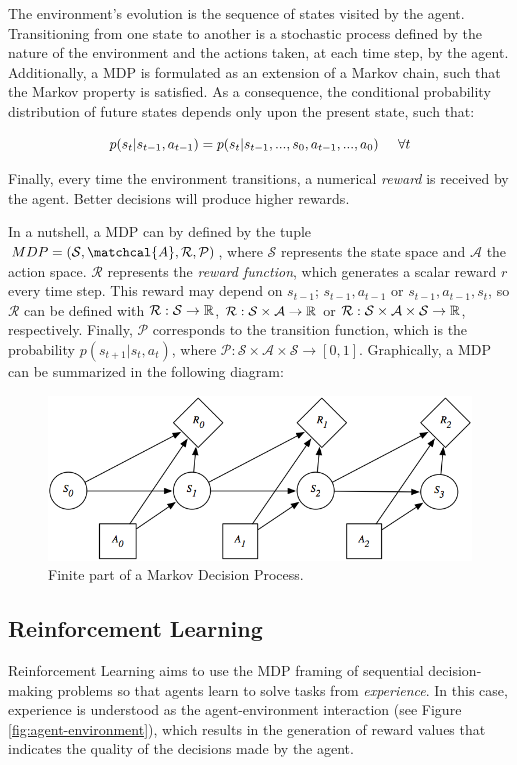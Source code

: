 The environment's evolution is the sequence of states visited by the agent. Transitioning from one state to another is a stochastic process defined by the nature of the environment and the actions taken, at each time step, by the agent. Additionally, a MDP is formulated as an extension of a Markov chain, such that the Markov property is satisfied. As a consequence, the conditional probability distribution of future states depends only upon the present state, such that:

\begin{equation}
    p(s_{t}|s_{t-1}, a_{t-1}) = p(s_{t}|s_{t-1},...,s_{0},a_{t-1},...,a_{0})  \hspace{0.5cm} \forall t
\end{equation}

Finally, every time the environment transitions, a numerical \emph{reward} is received by the agent. Better decisions will produce higher rewards.

In a nutshell, a MDP can by defined by the tuple $MDP=(\mathcal{S},\matchcal{A},\mathcal{R},\mathcal{P})$, where $\mathcal{S}$ represents the state space and $\mathcal{A}$ the action space. $\mathcal{R}$ represents the \emph{reward function}, which generates a scalar reward $r$ every time step. This reward may depend on $s_{t-1}$; $s_{t-1},a_{t-1}$ or $s_{t-1},a_{t-1},s_{t}$, so $\mathcal{R}$ can be defined with $\mathcal{R}: \mathcal{S} \to \mathbb{R}$, $\mathcal{R}: \mathcal{S} \times \mathcal{A} \to \mathbb{R}$ or $\mathcal{R}: \mathcal{S} \times \mathcal{A} \times \mathcal{S} \to \mathbb{R}$, respectively. Finally, $\mathcal{P}$ corresponds to the transition function, which is the probability $p(s_{t+1}|s_{t}, a_{t})$, where $\mathcal{P}: \mathcal{S} \times \mathcal{A} \times \mathcal{S} \to [0, 1]$. Graphically, a MDP can be summarized in the following diagram:

\begin{figure}[H]
    \centering
    \includegraphics[width=0.7\linewidth]{imagenes/cap1/mdp.png}
    \caption{Finite part of a Markov Decision Process.}
    \label{fig:msim}
\end{figure}

\subsection{Reinforcement Learning}
Reinforcement Learning aims to use the MDP framing of sequential decision-making problems so that agents learn to solve tasks from \emph{experience}. In this case, experience is understood as the agent-environment interaction (see Figure \ref{fig:agent-environment}), which results in the generation of reward values that indicates the quality of the decisions made by the agent. 

